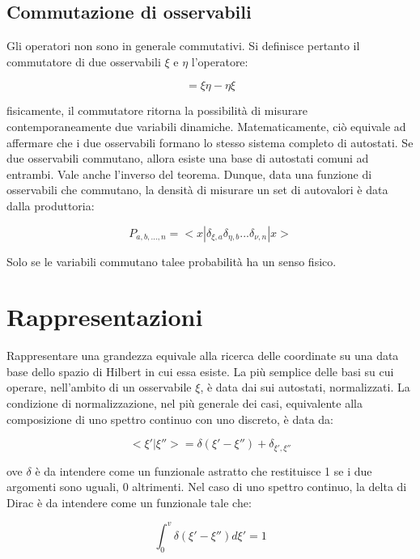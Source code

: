 \documentclass{article}
\begin{document}
\subsection{Commutazione di osservabili}
Gli operatori non sono in generale commutativi.
Si definisce pertanto il commutatore di due osservabili $\xi$ e $\eta$ l'operatore:

\begin{equation}
    [\xi,\eta]=\xi\eta-\eta\xi
\end{equation}

fisicamente, il commutatore ritorna la possibilità di misurare contemporaneamente due variabili dinamiche.
Matematicamente, ciò equivale ad affermare che i due osservabili formano lo stesso sistema completo di autostati.
Se due osservabili commutano, allora esiste una base di autostati comuni ad entrambi.
Vale anche l'inverso del teorema.
Dunque, data una funzione di osservabili che commutano, la densità di misurare un set di autovalori è data dalla produttoria:

\begin{equation}
    P_{a,b,...,n}=<x|\delta_{\xi,a}\delta_{\eta,b}...\delta_{\nu,n}|x>
\end{equation}

Solo se le variabili commutano talee probabilità ha un senso fisico.


\section{Rappresentazioni}
Rappresentare una grandezza equivale alla ricerca delle coordinate su una data base dello spazio di Hilbert in cui essa esiste.
La più semplice delle basi su cui operare, nell'ambito di un osservabile $\xi$, è data dai sui autostati, normalizzati.
La condizione di normalizzazione, nel più generale dei casi, equivalente alla composizione di uno spettro continuo con uno discreto, è data da:

\begin{equation}
    <\xi'|\xi''> = \delta(\xi'-\xi'') + \delta_{\xi',\xi''}
\end{equation}

ove $\delta$ è da intendere come un funzionale astratto che restituisce 1 se i due argomenti sono uguali, 0 altrimenti.
Nel caso di uno spettro continuo, la delta di Dirac è da intendere come un funzionale tale che:

\begin{equation}
    \int_{0}^{v} \delta(\xi'-\xi'')d\xi' = 1
\end{equation}
\end{document}
